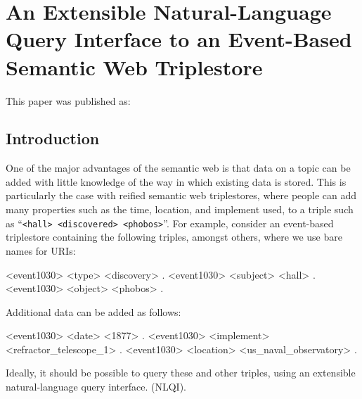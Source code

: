 \documentclass[../main.tex]{subfiles}
\begin{document}
\chapter{An Extensible Natural-Language Query Interface to an Event-Based Semantic Web Triplestore}
\begin{refsection}

\label{chapter:extensible}

This paper was published as:



\section{Introduction}

One of the major advantages of the semantic web is that data on a topic can be added with little
knowledge of the way in which existing data is stored. This is particularly the case with reified semantic web
triplestores, where people can add many properties such as the time, location, and implement used, to
a triple such as ``\texttt{<hall> <discovered> <phobos>}''. For example, consider an event-based triplestore containing the following triples, amongst others, where we use bare names for URIs:

\begin{boldcode}
	<event1030> <type> <discovery> .
	<event1030> <subject> <hall> .
	<event1030> <object> <phobos> .
\end{boldcode}

Additional data can be added as follows:

\begin{boldcode}
	<event1030> <date> <1877> .
	<event1030> <implement> <refractor_telescope_1> .
	<event1030> <location> <us_naval_observatory> .
\end{boldcode}

Ideally, it should be possible to query these and other triples, using an extensible natural-language query
interface. (NLQI).


\end{refsection}
\end{document}
